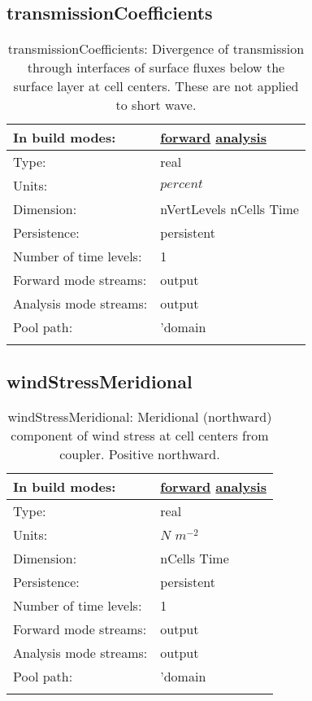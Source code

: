 \subsection[transmissionCoefficients]{transmissionCoefficients}
\label{subsec:var_sec_forcing_transmissionCoefficients}
\begin{center}
\begin{longtable}{| p{2.0in} | p{4.0in} |}
        \hline 
        In build modes: & \hyperref[subsec:forward_var_tab_forcing]{forward} \hyperref[subsec:analysis_var_tab_forcing]{analysis} \\
        \hline 
        Type: & real \\
        \hline 
        Units: & $percent$ \\
        \hline 
        Dimension: & nVertLevels nCells Time \\
        \hline 
        Persistence: & persistent \\
        \hline 
        Number of time levels: & 1 \\
        \hline 
		 Forward mode streams: &  output \\
        \hline 
		 Analysis mode streams: &  output \\
        \hline 
            Pool path: & 'domain %
 \\
		 \hline 
    \caption{transmissionCoefficients: Divergence of transmission through interfaces of surface fluxes below the surface layer at cell centers. These are not applied to short wave.}
\end{longtable}
\end{center}
\subsection[windStressMeridional]{windStressMeridional}
\label{subsec:var_sec_forcing_windStressMeridional}
\begin{center}
\begin{longtable}{| p{2.0in} | p{4.0in} |}
        \hline 
        In build modes: & \hyperref[subsec:forward_var_tab_forcing]{forward} \hyperref[subsec:analysis_var_tab_forcing]{analysis} \\
        \hline 
        Type: & real \\
        \hline 
        Units: & $N$ $m^{-2}$ \\
        \hline 
        Dimension: & nCells Time \\
        \hline 
        Persistence: & persistent \\
        \hline 
        Number of time levels: & 1 \\
        \hline 
		 Forward mode streams: &  output \\
        \hline 
		 Analysis mode streams: &  output \\
        \hline 
            Pool path: & 'domain %
 \\
		 \hline 
    \caption{windStressMeridional: Meridional (northward) component of wind stress at cell centers from coupler. Positive northward.}
\end{longtable}
\end{center}
